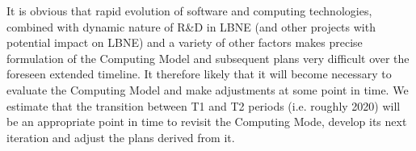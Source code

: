 It is obvious that rapid evolution of software and computing technologies, combined with dynamic nature of R\&D in LBNE (and other  projects with potential impact on LBNE) and a variety of other factors makes precise formulation of the Computing Model and subsequent plans very difficult over the foreseen extended timeline. It  therefore likely that it will become necessary to evaluate the Computing Model and make adjustments at some point in time. We estimate that the transition between T1 and T2 periods (i.e. roughly 2020) will be an appropriate point in time to revisit the Computing Mode, develop its next
iteration and adjust the plans derived from it.

